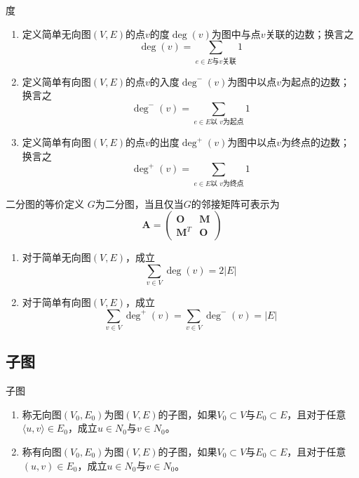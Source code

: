 \documentclass[lang = cn, scheme = chinese, thmcnt = section]{elegantbook}
\newcommand{\sub}{\subset}             %
\newcommand{\bs}{\boldsymbol}          %
\begin{document}
\begin{definition}{度}
	\begin{enumerate}
		\item 定义简单无向图$(V,E)$的点$v$的度$\deg(v)$为图中与点$v$关联的边数；换言之%
		$$
		\deg(v)=\sum_{e\in E\text{与}v\text{关联}}1
		$$
		\item 定义简单有向图$(V,E)$的点$v$的入度$\deg^-(v)$为图中以点$v$为起点的边数；换言之%
		$$
		\deg^-(v)=\sum_{e\in E\text{以 }v\text{为起点}}1
		$$
		\item 定义简单有向图$(V,E)$的点$v$的出度$\deg^+(v)$为图中以点$v$为终点的边数；换言之%
		$$
		\deg^+(v)=\sum_{e\in E\text{以 }v\text{为终点}}1
		$$
	\end{enumerate}
\end{definition}

\begin{theorem}{二分图的等价定义}
	$G$为二分图，当且仅当$G$的邻接矩阵可表示为%
	$$
	\bs{A}=\begin{pmatrix}
		\bs{O} & \bs{M}\\
		\bs{M}^T & \bs{O}
	\end{pmatrix}
	$$
\end{theorem}

\begin{theorem}
	\begin{enumerate}
		\item 对于简单无向图$(V,E)$，成立%
		$$
		\sum_{v\in V}\deg(v)=2|E|
		$$
		\item 对于简单有向图$(V,E)$，成立
		$$
		\sum_{v\in V}\deg^+(v)=\sum_{v\in V}\deg^-(v)=|E|
		$$
	\end{enumerate}
\end{theorem}

\subsection{子图}

\begin{definition}{子图}
	\begin{enumerate}
		\item 称无向图$(V_0,E_0)$为图$(V,E)$的子图，如果$V_0\sub V$与$E_0\sub E$，且对于任意$\langle u,v \rangle\in E_0$，成立$u\in N_0$与$v\in N_0$。
		\item 称有向图$(V_0,E_0)$为图$(V,E)$的子图，如果$V_0\sub V$与$E_0\sub E$，且对于任意$(u,v)\in E_0$，成立$u\in N_0$与$v\in N_0$。
	\end{enumerate}
\end{definition}
\end{document}
